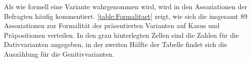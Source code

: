Als wie formell eine Variante wahrgenommen wird, wird in den Assoziationen der Befragten häufig kommentiert.   
\autoref{table:Formalitaet} zeigt, wie sich die insgesamt 89 Assoziationen zur Formalität der präsentierten Varianten auf Kasus und Präpositionen verteilen. 
In den grau hinterlegten Zellen sind die Zahlen für die Dativvarianten angegeben, in der zweiten Hälfte der Tabelle findet sich die Auszählung für die Genitivvarianten. 

